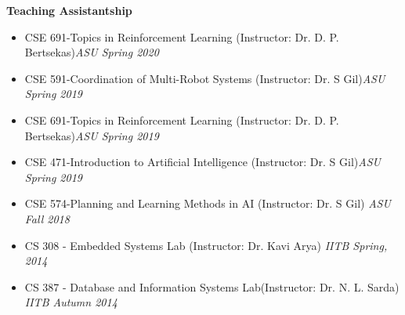 \documentclass[a4paper,11pt]{article}
\newcommand{\resheading}[1]{{\small \colorbox{mygrey}{\begin{minipage}{0.975\textwidth}{\textbf{#1 \vphantom{p\^{E}}}}\end{minipage}}}}
\begin{document}
\resheading{\textbf{\large Teaching Assistantship}}
\begin{description}
\item
\begin{itemize}
	\item CSE 691-Topics in Reinforcement Learning (Instructor: Dr. D. P. Bertsekas)\hfill\textit{ASU Spring 2020}
\end{itemize}
\item 
\begin{itemize}
	\item CSE 591-Coordination of Multi-Robot Systems (Instructor: Dr. S Gil)\hfill  \textit{ASU Spring 2019}
\end{itemize}
\item 
\begin{itemize}
	\item CSE 691-Topics in Reinforcement Learning (Instructor: Dr. D. P. Bertsekas)\hfill  \textit{ASU Spring 2019}
\end{itemize}
\item 
\begin{itemize}
	\item CSE 471-Introduction to Artificial Intelligence (Instructor: Dr. S Gil)\hfill  \textit{ASU Spring 2019}
\end{itemize}
\item 
\begin{itemize}
	\item CSE 574-Planning and Learning Methods in AI (Instructor: Dr. S Gil) \hfill \textit{ASU Fall 2018}
\end{itemize}
\item 
\begin{itemize}
	\item CS 308 - Embedded Systems Lab (Instructor: Dr. Kavi Arya) \hfill \textit{IITB Spring, 2014}
\end{itemize}
\item 
\begin{itemize}
     \item CS 387 - Database and Information Systems Lab(Instructor: Dr. N. L. Sarda) \hfill \textit{IITB Autumn 2014}
\end{itemize}
\end{description}
\end{document}
